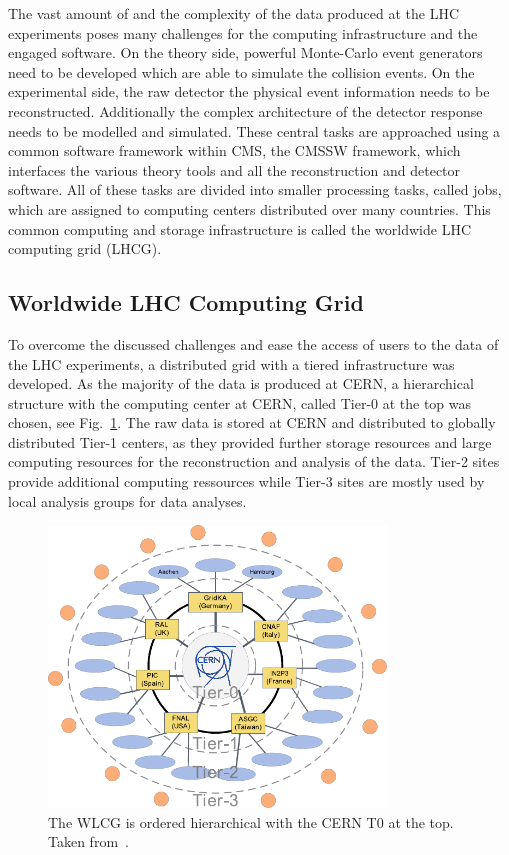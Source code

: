 The vast amount of and the complexity of the data produced at the LHC
experiments poses many challenges for the computing infrastructure and the
engaged software. On the theory side, powerful Monte-Carlo event generators need to be
developed which are able to simulate the collision events. On the experimental
side, the raw detector the physical event information needs to be reconstructed. Additionally the
complex architecture of the detector response needs to be modelled and
simulated. These central tasks are approached using a common software framework
within CMS, the CMSSW framework, which interfaces the various theory tools and
all the reconstruction and detector software. All of these tasks are divided
into smaller processing tasks, called jobs, which are assigned to computing
centers distributed over many countries. This common computing and storage
infrastructure is called the worldwide LHC computing grid (LHCG).

\subsection{Worldwide LHC Computing Grid}

To overcome the discussed challenges and ease the access of users to the data of
the LHC experiments, a distributed grid with a tiered infrastructure was
developed. As the majority of the data is produced at CERN, a hierarchical
structure with the computing center at CERN, called Tier-0 at the top was
chosen, see Fig.~\ref{fig:lhc_tier_structure}. The raw data is stored at CERN
and distributed to globally distributed Tier-1 centers, as they provided further
storage resources and large computing resources for the reconstruction and
analysis of the data. Tier-2 sites provide additional computing ressources while
Tier-3 sites are mostly used by local analysis groups for data analyses.

\begin{figure}[htp]
    \centering
    \includegraphics[width=0.8\textwidth]{figures/cms_detector/lhcg.pdf}\hfill
    \caption[Tiered structure of the worldwide LHC Computing Grid]{The WLCG is
        ordered hierarchical with the CERN T0 at the top. Taken
        from~\cite{Stober:2012abc}.}
    \label{fig:lhc_tier_structure}
\end{figure}

